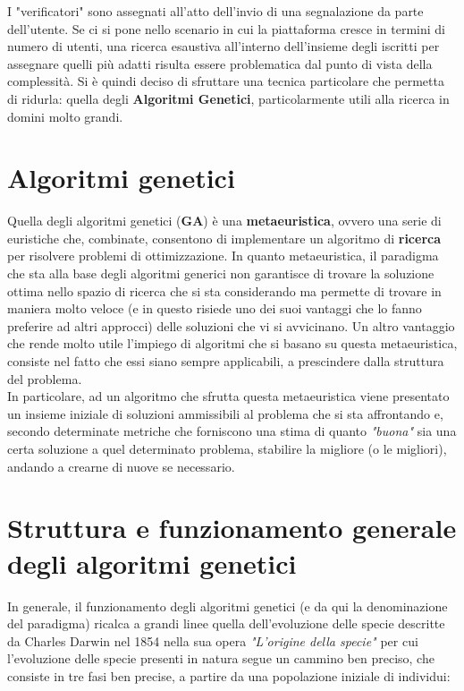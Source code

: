     I "verificatori" sono assegnati all'atto dell'invio di una segnalazione da parte dell'utente. 
    Se ci si pone nello scenario in cui la piattaforma cresce in termini di numero di utenti, una ricerca esaustiva all'interno dell'insieme degli iscritti per assegnare quelli più adatti risulta essere problematica dal punto di vista della complessità. Si è quindi deciso di sfruttare una tecnica particolare che permetta di ridurla: quella degli \textbf{Algoritmi Genetici}, particolarmente utili alla ricerca in domini molto grandi.

\section{Algoritmi genetici}
    Quella degli algoritmi genetici (\textbf{GA}) è una \textbf{metaeuristica}, ovvero una serie di euristiche che, combinate, consentono di implementare un algoritmo di \textbf{ricerca} per risolvere problemi di ottimizzazione. In quanto metaeuristica, il paradigma che sta alla base degli algoritmi generici non garantisce di trovare la soluzione ottima nello spazio di ricerca che si sta considerando ma permette di trovare in maniera molto veloce (e in questo risiede uno dei suoi vantaggi che lo fanno preferire ad altri approcci) delle soluzioni che vi si avvicinano. Un altro vantaggio che rende molto utile l'impiego di algoritmi che si basano su questa metaeuristica, consiste nel fatto che essi siano sempre applicabili, a prescindere dalla struttura del problema. \\
    In particolare, ad un algoritmo che sfrutta questa metaeuristica viene presentato un insieme iniziale di soluzioni ammissibili al problema che si sta affrontando e, secondo determinate metriche che forniscono una stima di quanto \textit{"buona"} sia una certa soluzione a quel determinato problema, stabilire la migliore (o le migliori), andando a crearne di nuove se necessario.

\section{Struttura e funzionamento generale degli algoritmi genetici}
    In generale, il funzionamento degli algoritmi genetici (e da qui la denominazione del paradigma) ricalca a grandi linee quella dell'evoluzione delle specie descritte da Charles Darwin nel 1854 nella sua opera \textit{"L'origine della specie"} per cui l'evoluzione delle specie presenti in natura segue un cammino ben preciso, che consiste in tre fasi ben precise, a partire da una popolazione iniziale di individui:

